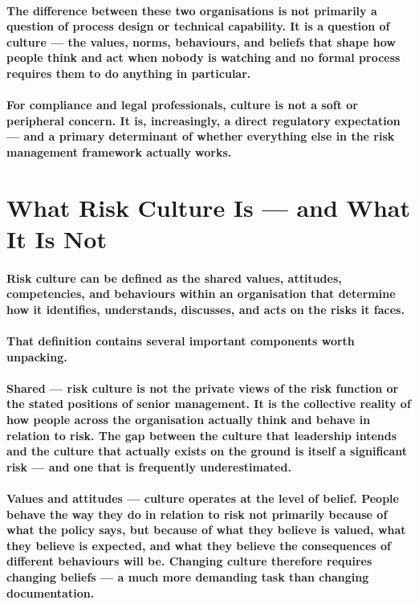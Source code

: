 \paragraph{The difference between these two organisations is not primarily a question of process design or technical capability. It is a question of culture — the values, norms, behaviours, and beliefs that shape how people think and act when nobody is watching and no formal process requires them to do anything in particular.}
\paragraph{For compliance and legal professionals, culture is not a soft or peripheral concern. It is, increasingly, a direct regulatory expectation — and a primary determinant of whether everything else in the risk management framework actually works.}

\section{What Risk Culture Is — and What It Is Not}
\paragraph{\textbf{Risk culture} can be defined as the shared values, attitudes, competencies, and behaviours within an organisation that determine how it identifies, understands, discusses, and acts on the risks it faces.}
\paragraph{That definition contains several important components worth unpacking.}
\paragraph{\textbf{Shared} — risk culture is not the private views of the risk function or the stated positions of senior management. It is the collective reality of how people across the organisation actually think and behave in relation to risk. The gap between the culture that leadership intends and the culture that actually exists on the ground is itself a significant risk — and one that is frequently underestimated.}
\paragraph{\textbf{Values and attitudes} — culture operates at the level of belief. People behave the way they do in relation to risk not primarily because of what the policy says, but because of what they believe is valued, what they believe is expected, and what they believe the consequences of different behaviours will be. Changing culture therefore requires changing beliefs — a much more demanding task than changing documentation.}
